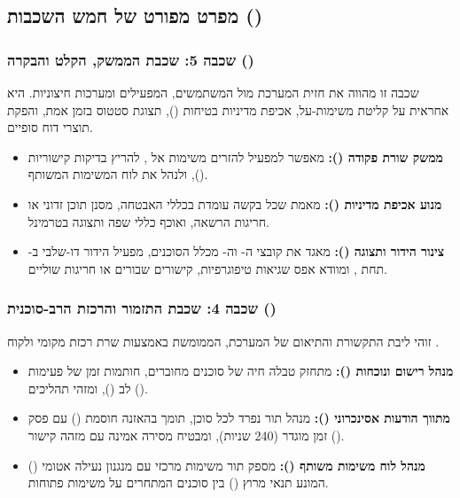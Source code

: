 \subsection{מפרט מפורט של חמש השכבות ()}

\subsubsection{שכבה 5: שכבת הממשק, הקלט והבקרה ()}
שכבה זו מהווה את חזית המערכת מול המשתמשים, המפעילים ומערכות חיצוניות. היא אחראית על קליטת משימות-על, אכיפת מדיניות בטיחות (), תצוגת סטטוס בזמן אמת, והפקת תוצרי דוח סופיים.
\begin{itemize}[leftmargin=1.2cm]
  \item \textbf{ממשק שורת פקודה ():} מאפשר למפעיל להזרים משימות אל , להריץ בדיקות קישוריות (), ולנהל את לוח המשימות המשותף.
  \item \textbf{מנוע אכיפת מדיניות ():} מאמת שכל בקשה עומדת בכללי האבטחה, מסנן תוכן זדוני או חריגות הרשאה, ואוכף כללי שפה ותצוגה בטרמינל.
  \item \textbf{צינור הידור ותצוגה ():} מאגד את קובצי ה- וה- מכלל הסוכנים, מפעיל הידור דו-שלבי ב- תחת , ומוודא אפס שגיאות טיפוגרפיות, קישורים שבורים או חריגות שוליים.
\end{itemize}

\subsubsection{שכבה 4: שכבת התזמור והרכזת הרב-סוכנית ()}
זוהי ליבת התקשורת והתיאום של המערכת, הממומשת באמצעות שרת רכזת מקומי ולקוח .
\begin{itemize}[leftmargin=1.2cm]
  \item \textbf{מנהל רישום ונוכחות ():} מתחזק טבלה חיה של סוכנים מחוברים, חותמות זמן של פעימות לב (), ומזהי תהליכים ().
  \item \textbf{מתווך הודעות אסינכרוני ():} מנהל תור  נפרד לכל סוכן, תומך בהאזנה חוסמת () עם פסק זמן מוגדר (240 שניות), ומבטיח מסירה אמינה עם מזהה קישור ().
  \item \textbf{מנהל לוח משימות משותף ():} מספק תור משימות מרכזי עם מנגנון נעילה אטומי () המונע תנאי מרוץ () בין סוכנים המתחרים על משימות פתוחות.
\end{itemize}

